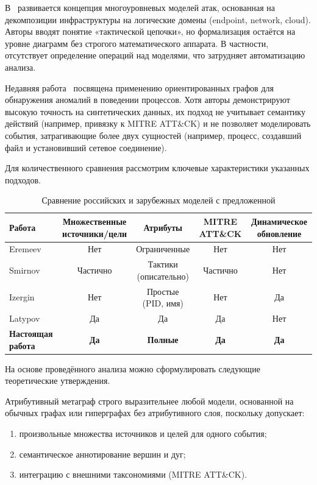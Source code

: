 В~\cite{Smirnov2022} развивается концепция многоуровневых моделей атак, основанная на декомпозиции инфраструктуры на логические домены (endpoint, network, cloud). Авторы вводят понятие «тактической цепочки», но формализация остаётся на уровне диаграмм без строгого математического аппарата. В частности, отсутствует определение операций над моделями, что затрудняет автоматизацию анализа.

Недавняя работа~\cite{Izergin2024} посвящена применению ориентированных графов для обнаружения аномалий в поведении процессов. Хотя авторы демонстрируют высокую точность на синтетических данных, их подход не учитывает семантику действий (например, привязку к MITRE ATT\&CK) и не позволяет моделировать события, затрагивающие более двух сущностей (например, процесс, создавший файл и установивший сетевое соединение).

Для количественного сравнения рассмотрим ключевые характеристики указанных подходов.

\begin{table}[h]
    \centering
    \caption{Сравнение российских и зарубежных моделей с предложенной}
    \label{tab:russian_comparison}
    \begin{tabular}{lcccc}
        \toprule
        Работа & Множественные источники/цели & Атрибуты & MITRE ATT\&CK & Динамическое обновление \\
        \midrule
        Eremeev~\cite{Eremeev2003} & Нет & Ограниченные & Нет & Нет \\
        Smirnov~\cite{Smirnov2022} & Частично & Тактики (описательно) & Частично & Нет \\
        Izergin~\cite{Izergin2024} & Нет & Простые (PID, имя) & Нет & Да \\
        Latypov~\cite{Latypov2020} & Да & Да & Да & Нет \\
        \textbf{Настоящая работа} & \textbf{Да} & \textbf{Полные} & \textbf{Да} & \textbf{Да} \\
        \bottomrule
    \end{tabular}
\end{table}

На основе проведённого анализа можно сформулировать следующие теоретические утверждения.

\begin{theorem}
    Атрибутивный метаграф строго выразительнее любой модели, основанной на обычных графах или гиперграфах без атрибутивного слоя, поскольку допускает:
    \begin{enumerate}
        \item произвольные множества источников и целей для одного события;
        \item семантическое аннотирование вершин и дуг;
        \item интеграцию с внешними таксономиями (MITRE ATT\&CK).
    \end{enumerate}
\end{theorem}

